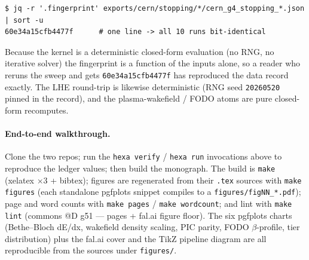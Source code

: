 \begin{lstlisting}
$ jq -r '.fingerprint' exports/cern/stopping/*/cern_g4_stopping_*.json | sort -u
60e34a15cfb4477f      # one line -> all 10 runs bit-identical
\end{lstlisting}

Because the kernel is a deterministic closed-form evaluation (no RNG, no
iterative solver) the fingerprint is a function of the inputs alone, so a
reader who reruns the sweep and gets \texttt{60e34a15cfb4477f} has
reproduced the data record exactly. The LHE round-trip is likewise
deterministic (RNG seed \texttt{20260520} pinned in the record), and the
plasma-wakefield / FODO atoms are pure closed-form recomputes.

\paragraph{End-to-end walkthrough.} Clone the two repos; run the
\verb|hexa verify| / \verb|hexa run| invocations above to reproduce the
ledger values; then build the monograph. The build is \texttt{make}
(xelatex $\times 3$ + bibtex); figures are regenerated from their
\texttt{.tex} sources with \texttt{make figures} (each standalone
pgfplots snippet compiles to a \texttt{figures/figNN\_*.pdf}); page and
word counts with \texttt{make pages} / \texttt{make wordcount}; and lint
with \texttt{make lint} (commons @D g51 --- pages + fal.ai figure floor).
The six pgfplots charts (Bethe--Bloch dE/dx, wakefield density scaling,
PIC parity, FODO $\beta$-profile, tier distribution) plus the fal.ai
cover and the TikZ pipeline diagram are all reproducible from the sources
under \verb|figures/|.
